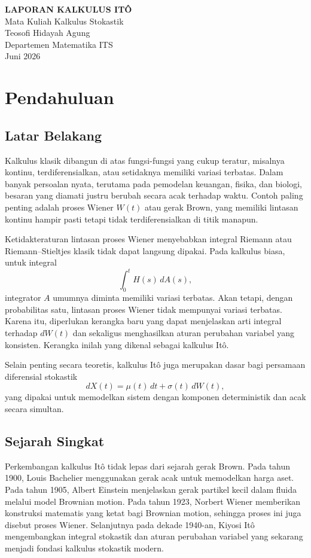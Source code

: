 \documentclass[12pt,a4paper]{article}
\theoremstyle{definition}
\theoremstyle{plain}
\begin{document}
\begin{center}
  {\Large \textbf{LAPORAN KALKULUS IT\^O}}\\[0.3cm]
  {\large Mata Kuliah Kalkulus Stokastik}\\[0.5cm]
  Teosofi Hidayah Agung\\
  Departemen Matematika ITS\\
  Juni 2026
\end{center}

\section{Pendahuluan}

\subsection{Latar Belakang}

Kalkulus klasik dibangun di atas fungsi-fungsi yang cukup teratur, misalnya
kontinu, terdiferensialkan, atau setidaknya memiliki variasi terbatas.
Dalam banyak persoalan nyata, terutama pada pemodelan keuangan, fisika, dan
biologi, besaran yang diamati justru berubah secara acak terhadap waktu.
Contoh paling penting adalah proses Wiener $W(t)$ atau gerak Brown, yang
memiliki lintasan kontinu hampir pasti tetapi tidak terdiferensialkan di titik
manapun.

Ketidakteraturan lintasan proses Wiener menyebabkan integral Riemann atau
Riemann--Stieltjes klasik tidak dapat langsung dipakai. Pada kalkulus biasa,
untuk integral
\[
  \int_0^t H(s)\,dA(s),
\]
integrator $A$ umumnya diminta memiliki variasi terbatas. Akan tetapi, dengan
probabilitas satu, lintasan proses Wiener tidak mempunyai variasi terbatas.
Karena itu, diperlukan kerangka baru yang dapat menjelaskan arti integral
terhadap $dW(t)$ dan sekaligus menghasilkan aturan perubahan variabel yang
konsisten. Kerangka inilah yang dikenal sebagai kalkulus It\^o.

Selain penting secara teoretis, kalkulus It\^o juga merupakan dasar bagi
persamaan diferensial stokastik
\[
  dX(t)=\mu(t)\,dt+\sigma(t)\,dW(t),
\]
yang dipakai untuk memodelkan sistem dengan komponen deterministik dan acak
secara simultan.

\subsection{Sejarah Singkat}

Perkembangan kalkulus It\^o tidak lepas dari sejarah gerak Brown. Pada tahun
1900, Louis Bachelier menggunakan gerak acak untuk memodelkan harga aset.
Pada tahun 1905, Albert Einstein menjelaskan gerak partikel kecil dalam fluida
melalui model Brownian motion. Pada tahun 1923, Norbert Wiener memberikan
konstruksi matematis yang ketat bagi Brownian motion, sehingga proses ini juga
disebut proses Wiener. Selanjutnya pada dekade 1940-an, Kiyosi It\^o
mengembangkan integral stokastik dan aturan perubahan variabel yang sekarang
menjadi fondasi kalkulus stokastik modern.
\end{document}

